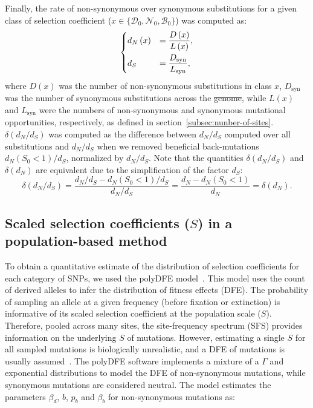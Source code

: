 \documentclass{article}
\newcommand{\dn}{d_N}
\newcommand{\ds}{d_S}
\newcommand{\dnds}{\dn / \ds}
\newcommand{\Sphy}{S_{0}}
\newcommand{\SphyDel}{\mathcal{D}_0}
\newcommand{\SphyNeu}{\mathcal{N}_0}
\newcommand{\SphyBen}{\mathcal{B}_0}
\newcommand{\Sphyclass}{x}
\newcommand{\Spop}{S}
\newcommand{\AdvMean}{\beta_b}
\newcommand{\DelMean}{\beta_d}
\providecommand{\DIFaddtex}[1]{{\protect\color{blue}\uwave{#1}}} %
\providecommand{\DIFdeltex}[1]{{\protect\color{red}\sout{#1}}}                      %
\providecommand{\DIFaddbegin}{} %
\providecommand{\DIFaddend}{} %
\providecommand{\DIFdelbegin}{} %
\providecommand{\DIFdelend}{} %
\providecommand{\DIFadd}[1]{\texorpdfstring{\DIFaddtex{#1}}{#1}} %
\providecommand{\DIFdel}[1]{\texorpdfstring{\DIFdeltex{#1}}{}} %
\newcommand{\DIFscaledelfig}{0.5}
\newlength{\DIFdelgraphicswidth} %
\newlength{\DIFdelgraphicsheight} %
\newcommand{\DIFaddincludegraphics}[2][]{{\color{blue}\fbox{\DIFOincludegraphics[#1]{#2}}}} %
\newcommand{\DIFdelincludegraphics}[2][]{%
\sbox{\DIFdelgraphicsbox}{\DIFOincludegraphics[#1]{#2}}%
\settoboxwidth{\DIFdelgraphicswidth}{\DIFdelgraphicsbox} %
\settoboxtotalheight{\DIFdelgraphicsheight}{\DIFdelgraphicsbox} %
\scalebox{\DIFscaledelfig}{%
\parbox[b]{\DIFdelgraphicswidth}{\usebox{\DIFdelgraphicsbox}\\[-\baselineskip] \rule{\DIFdelgraphicswidth}{0em}}\llap{\resizebox{\DIFdelgraphicswidth}{\DIFdelgraphicsheight}{%
\setlength{\unitlength}{\DIFdelgraphicswidth}%
\begin{picture}(1,1)%
\thicklines\linethickness{2pt} %
{\color[rgb]{1,0,0}\put(0,0){\framebox(1,1){}}}%
{\color[rgb]{1,0,0}\put(0,0){\line( 1,1){1}}}%
{\color[rgb]{1,0,0}\put(0,1){\line(1,-1){1}}}%
\end{picture}%
}\hspace*{3pt}}} %
} %
\DeclareRobustCommand{\DIFaddbegin}{\DIFOaddbegin \let\includegraphics\DIFaddincludegraphics} %
\DeclareRobustCommand{\DIFaddend}{\DIFOaddend \let\includegraphics\DIFOincludegraphics} %
\DeclareRobustCommand{\DIFdelbegin}{\DIFOdelbegin \let\includegraphics\DIFdelincludegraphics} %
\DeclareRobustCommand{\DIFdelend}{\DIFOaddend \let\includegraphics\DIFOincludegraphics} %
\begin{document}
    Finally, the rate of non-synonymous over synonymous substitutions for a given class of selection coefficient ($\Sphyclass \in \{\SphyDel, \SphyNeu, \SphyBen \}$) was computed as:
    \begin{align}
        \begin{dcases}
            \dn \left( \Sphyclass \right) &= \dfrac{D\left( \Sphyclass \right)}{L \left( \Sphyclass \right)}, \\
            \ds &= \dfrac{D_{\text{syn}}}{L_{\text{syn}}},
        \end{dcases}\label{eq:dnds}
    \end{align}
    where $D \left( \Sphyclass \right) $ was the number of non-synonymous substitutions in class $\Sphyclass$, $D_{\text{syn}}$ was the number of synonymous substitutions across the \DIFdelbegin \DIFdel{genome}\DIFdelend \DIFaddbegin \DIFadd{exome}\DIFaddend , while $L \left( \Sphyclass \right)$ and $L_{\text{syn}}$ were the numbers of non-synonymous and synonymous mutational opportunities, respectively, as defined in section~\ref{subsec:nunber-of-sites}.
    $\delta(\dnds)$ was computed as the difference between $\dnds$ computed over all substitutions and $\dnds$ when we removed beneficial back-mutations $\dn (\Sphy < 1) / \ds$, normalized by $\dnds$.
    Note that the quantities $\delta(\dnds)$ and $\delta(\dn)$ are equivalent due to the simplification of the factor $\ds$:
    \begin{equation}
        \delta(\dnds) = \dfrac{\dnds - \dn(\Sphy < 1) / \ds}{\dnds} = \dfrac{\dn - \dn(\Sphy < 1)}{\dn} = \delta(\dn).\label{eq:delta-dnds}
    \end{equation}

    \subsection{Scaled selection coefficients ($\Spop$) in a population-based method}
    \label{subsec:s-polymorphism-method}

    To obtain a quantitative estimate of the distribution of selection coefficients for each category of SNPs, we used the polyDFE model~\cite{tataru_inference_2017, tataru_polydfe_2020}.
    This model uses the count of derived alleles to infer the distribution of fitness effects (DFE).
    The probability of sampling an allele at a given frequency (before fixation or extinction) is informative of its scaled selection coefficient at the population scale ($\Spop$).
    Therefore, pooled across many sites, the site-frequency spectrum (SFS) provides information on the underlying $\Spop$ of mutations.
    However, estimating a single $\Spop$ for all sampled mutations is biologically unrealistic, and a DFE of mutations is usually assumed~\cite{eyre-walker_distribution_2006, eyre-walker_estimating_2009}.
    The polyDFE\cite{tataru_inference_2017, tataru_polydfe_2020} software implements a mixture of a $\Gamma$ and exponential distributions to model the DFE of non-synonymous mutations, while synonymous mutations are considered neutral.
    The model estimates the parameters $\DelMean$, $b$, $p_b$ and $\AdvMean$ for non-synonymous mutations as:
\end{document}
